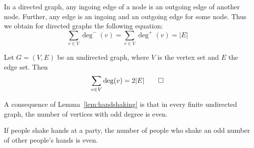 In a directed graph, any ingoing edge of a node is an outgoing edge of another node.
Further, any edge is an ingoing and an outgoing edge for some node.
Thus we obtain for directed graphs the following equation:
\[
\sum_{v\in V} \deg^-(v) = \sum_{v\in V} \deg^+(v) = |E|
\]
\begin{lemma}[Handshaking]\label{lem:handshaking}
Let \(G=(V,E)\) be an undirected graph, where \(V\) is the vertex set and \(E\) the edge set.
Then
\[
\sum_{v\in V} \deg(v) = 2|E|
\qedhere
\]
\end{lemma}
A consequence of Lemma~\ref{lem:handshaking} is that in every finite undirected graph, the number of vertices with odd degree is even.
\begin{example}[Party]\label{ex:handshaking-party}
If people shake hands at a party, the number of people who shake an odd number of other people's hands is even.
\end{example}

